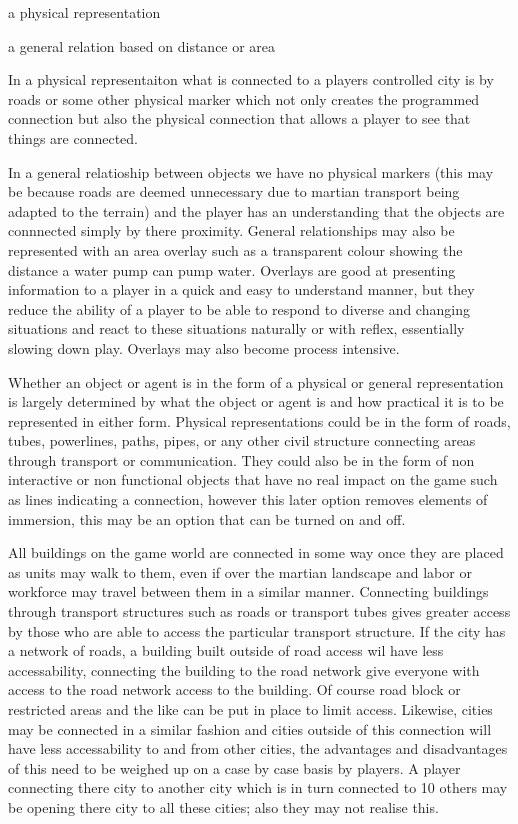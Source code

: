 \startitemize[2]
        \item a physical representation
        \item a general relation based on distance or area
\stopitemize

In a physical representaiton what is connected to a players controlled city is by roads or some other physical marker which not only creates the programmed connection but also the physical connection that allows a player to see that things are connected.

In a general relatioship between objects we have no physical markers (this may be because roads are deemed unnecessary due to martian transport being adapted to the terrain) and the player has an understanding that the objects are connnected simply by there proximity. General relationships may also be represented with an area overlay such as a transparent colour showing the distance a water pump can pump water. Overlays are good at presenting information to a player in a quick and easy to understand manner, but they reduce the ability of a player to be able to respond to diverse and changing situations and react to these situations naturally or with reflex, essentially slowing down play. Overlays may also become process intensive. 
  
 Whether an object or agent is in the form of a physical or general representation is largely determined by what the object or agent is and how practical it is to be represented in either form. Physical representations could be in the form of roads, tubes, powerlines, paths, pipes, or any other civil structure connecting areas through transport or communication. They could also be in the form of non interactive or non functional objects that have no real impact on the game such as lines indicating a connection, however this later option removes elements of immersion, this may be an option that can be turned on and off.


All buildings on the game world are connected in some way once they are placed as units may walk to them, even if over the martian landscape and labor or workforce may travel between them in a similar manner. Connecting buildings through transport structures such as roads or transport tubes gives greater access by those who are able to access the particular transport structure. If the city has a network of roads, a building built outside of road access wil have less accessability, connecting the building to the road network give everyone with access to the road network access to the building. Of course road block or restricted areas and the like can be put in place to limit access. Likewise, cities may be connected in a similar fashion and cities outside of this connection will have less accessability to and from other cities, the advantages and disadvantages of this need to be weighed up on a case by case basis by players. A player connecting there city to another city which is in turn connected to 10 others may be opening there city to all these cities; also they may not realise this.

